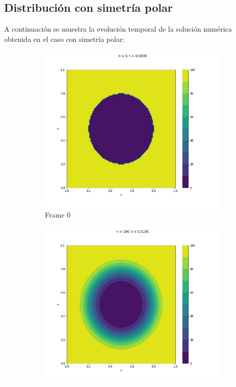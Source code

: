 \documentclass{article}
\begin{document}
\subsection{Distribución con simetría polar}
A continuación se muestra la evolución temporal de la solución numérica obtenida en el caso con simetría polar:

\begin{figure} [H]
  \centering
  \begin{subfigure}{0.25\linewidth}
    \centering
    \includegraphics[width=\linewidth]{Polar/2D/0.jpg}
    \caption{Frame 0}
  \end{subfigure}
  \begin{subfigure}{0.25\linewidth}
    \centering
    \includegraphics[width=\linewidth]{Polar/2D/190.jpg}

\end{subfigure}
\end{figure}
\end{document}
